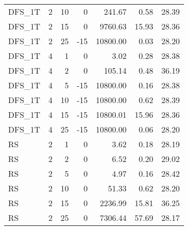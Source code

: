 \begin{center}
\begin{longtable}{lrrrrrr}
  DFS\_1T     & 2 & 10 &   0 & 241.67 & 0.58 & 28.39 \\ 
  DFS\_1T     & 2 & 15 &   0 & 9760.63 & 15.93 & 28.36 \\ 
  DFS\_1T     & 2 & 25 & -15 & 10800.00 & 0.03 & 28.20 \\ 
  DFS\_1T     & 4 & 1 &   0 & 3.02 & 0.28 & 28.38 \\ 
  DFS\_1T     & 4 & 2 &   0 & 105.14 & 0.48 & 36.19 \\ 
  DFS\_1T     & 4 & 5 & -15 & 10800.00 & 0.16 & 28.38 \\ 
  DFS\_1T     & 4 & 10 & -15 & 10800.00 & 0.62 & 28.39 \\ 
  DFS\_1T     & 4 & 15 & -15 & 10800.01 & 15.96 & 28.36 \\ 
  DFS\_1T     & 4 & 25 & -15 & 10800.00 & 0.06 & 28.20 \\ 
  RS     & 2 & 1 &   0 & 3.62 & 0.18 & 28.19 \\ 
  RS     & 2 & 2 &   0 & 6.52 & 0.20 & 29.02 \\ 
  RS     & 2 & 5 &   0 & 4.97 & 0.16 & 28.42 \\ 
  RS     & 2 & 10 &   0 & 51.33 & 0.62 & 28.20 \\ 
  RS     & 2 & 15 &   0 & 2236.99 & 15.81 & 36.25 \\ 
  RS     & 2 & 25 &   0 & 7306.44 & 57.69 & 28.17 \\ 

\end{longtable}
\end{center}
